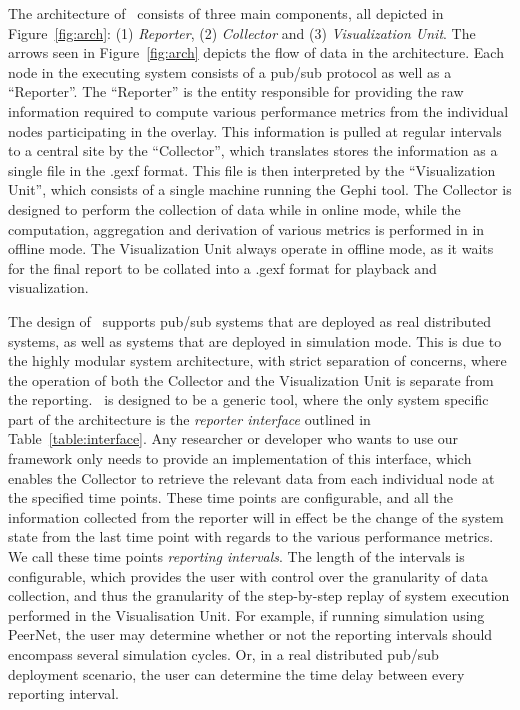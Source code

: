 The architecture of \demo~consists of three main components, all
depicted in Figure~\ref{fig:arch}: (1) \emph{Reporter}, (2)
\emph{Collector} and (3) \emph{Visualization Unit}.  The arrows seen in
Figure~\ref{fig:arch} depicts the flow of data in the architecture.
Each node in the executing system consists of a pub/sub protocol as well
as a ``Reporter''. The ``Reporter'' is the entity responsible for
providing the raw information required to compute various performance
metrics from the individual nodes participating in the overlay. This
information is pulled at regular intervals to a central site by the
``Collector'', which translates stores the information as a single
file in the .gexf format. This file is then interpreted by the
``Visualization Unit'', which consists of a single machine running
the Gephi tool. The Collector is designed to perform the collection of
data while in online mode, while the computation, aggregation and
derivation of various metrics is performed in in offline mode. The
Visualization Unit always operate in offline mode, as it waits for the
final report to be collated into a .gexf format for playback and
visualization.

The design of \demo~supports pub/sub systems that are deployed as
real distributed systems, as well as systems that are deployed in
simulation mode. This is due to the highly modular system architecture,
with strict separation of concerns, where the operation of both the
Collector and the Visualization Unit is separate from the reporting.
\demo~is designed to be a generic tool, where the only system specific
part of the architecture is the \emph{reporter interface} outlined in
Table~\ref{table:interface}. Any researcher or developer
who wants to use our framework only needs to provide an implementation
of this interface, which enables the Collector to retrieve the relevant
data from each individual node at the specified time points. These time
points are configurable, and all the information collected from the
reporter will in effect be the change of the system state from the last
time point with regards to the various performance metrics. We call
these time points \emph{reporting intervals}. The length of the intervals
is configurable, which provides the user with control over the
granularity of data collection, and thus the granularity of the
step-by-step replay of system execution performed in the Visualisation Unit. For example, if
running simulation using PeerNet, the user may determine whether or not
the reporting intervals should encompass several simulation cycles. Or,
in a real distributed pub/sub deployment scenario, the user can
determine the time delay between every reporting interval.


